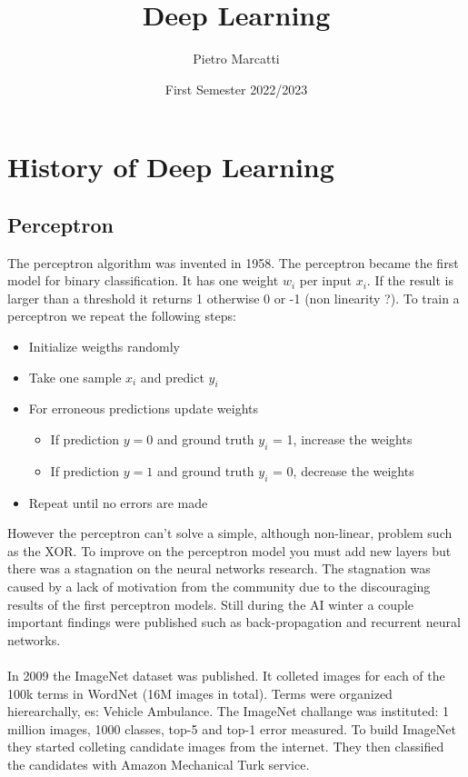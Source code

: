 \documentclass{article}
\title{Deep Learning}
\author{Pietro Marcatti}
\date{First Semester 2022/2023}
\begin{document}
\maketitle
\section{History of Deep Learning}
\subsection{Perceptron}
The perceptron algorithm was invented in 1958. The perceptron became the first model for binary classification. It has one weight $w_i$ per input $x_i$. If the result is larger than a threshold it returns 1 otherwise 0 or -1 (non linearity ?).
To train a perceptron we repeat the following steps:
\begin{itemize}
    \item Initialize weigths randomly
    \item Take one sample $x_i$ and predict $y_i$
    \item For erroneous predictions update weights
    \begin{itemize}
        \item If prediction $y = 0$ and ground truth $y_i$ = 1, increase the weights
        \item If prediction $y = 1$ and ground truth $y_i$ = 0, decrease the weights
    \end{itemize}
    \item Repeat until no errors are made
\end{itemize}
However the perceptron can't solve a simple, although non-linear, problem such as the XOR. 
To improve on the perceptron model you must add new layers but there was a stagnation on the neural networks research. The stagnation was caused by a lack of motivation from the community due to the discouraging results of the first perceptron models. 
Still during the AI winter a couple important findings were published such as back-propagation and recurrent neural networks.\\\\
In 2009 the ImageNet dataset was published. It colleted images for each of the 100k terms in WordNet (16M images in total). Terms were organized hierearchally, es: Vehicle \textrightarrow Ambulance.
The ImageNet challange was instituted: 1 million images, 1000 classes, top-5 and top-1 error measured. To build ImageNet they started colleting candidate images from the internet. They then classified the candidates with Amazon Mechanical Turk service.\\
\end{document}
